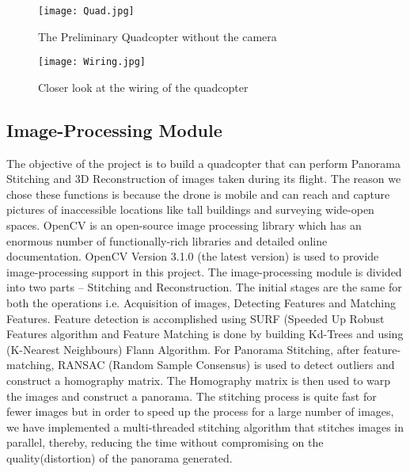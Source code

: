 \begin{figure}[H]
  \centering
  \texttt{[image: Quad.jpg]}
  \caption{The Preliminary Quadcopter without the camera}
  \label{first quadcopter}	
\end{figure}

\begin{figure}[H]
  \centering
  \texttt{[image: Wiring.jpg]}
  \caption{Closer look at the wiring of the quadcopter}
  \label{second quadcopter}	
\end{figure}



\subsection{Image-Processing Module}
The objective of the project is to build a quadcopter that can perform Panorama Stitching and 3D Reconstruction of images taken during its flight. The reason we chose these functions is because the drone is mobile and can reach and capture pictures of inaccessible locations like tall buildings and surveying wide-open spaces. OpenCV is an open-source image processing library which has an enormous number of functionally-rich libraries and detailed online documentation. OpenCV  Version 3.1.0 (the latest version) is used to provide image-processing support in this project.
The image-processing module is divided into two parts – Stitching and Reconstruction. The initial stages are the same for both the operations i.e. Acquisition of images, Detecting Features and Matching Features.  Feature detection is accomplished using SURF (Speeded Up Robust Features  algorithm and Feature Matching is done by building Kd-Trees and using (K-Nearest Neighbours) Flann Algorithm.
For Panorama Stitching, after feature-matching, RANSAC (Random Sample Consensus) is used to detect outliers and construct a homography matrix. The Homography matrix is then used to warp the images and construct a panorama. The stitching process is quite fast for fewer images but in order to speed up the process for a large number of images, we have implemented a multi-threaded stitching algorithm that stitches images in parallel, thereby, reducing the time without compromising on the quality(distortion) of the panorama generated.

